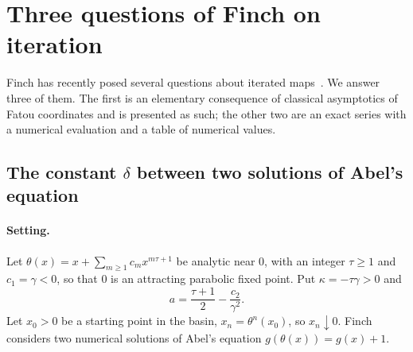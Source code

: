 \section{Three questions of Finch on iteration}\label{sec:finch}

Finch has recently posed several questions about iterated maps~\cite{FinchDelta,FinchIII,FinchIV}. We answer three of them. The first is an elementary consequence of classical asymptotics of Fatou coordinates and is presented as such; the other two are an exact series with a numerical evaluation and a table of numerical values.

\subsection{The constant $\delta$ between two solutions of Abel's equation}

\paragraph{Setting.} Let $\theta(x)=x+\sum_{m\ge1}c_mx^{m\tau+1}$ be analytic near $0$, with an integer $\tau\ge1$ and $c_1=\gamma<0$, so that $0$ is an attracting parabolic fixed point. Put $\kappa=-\tau\gamma>0$ and
\[
a=\frac{\tau+1}2-\frac{c_2}{\gamma^2}.
\]
Let $x_0>0$ be a starting point in the basin, $x_n=\theta^n(x_0)$, so $x_n\downarrow0$. Finch considers two numerical solutions of Abel's equation $g(\theta(x))=g(x)+1$.

